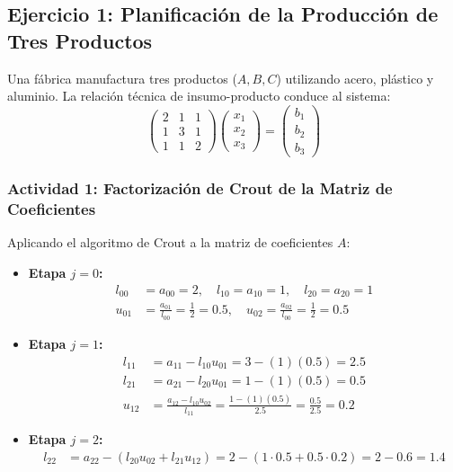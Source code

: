 \documentclass[11pt,a4paper]{article}
\theoremstyle{definition}
\theoremstyle{remark}
\begin{document}
\subsection{Ejercicio 1: Planificación de la Producción de Tres Productos}
Una fábrica manufactura tres productos ($A, B, C$) utilizando acero, plástico y aluminio. La relación técnica de insumo-producto conduce al sistema:
\begin{equation}
    \begin{pmatrix}
        2 & 1 & 1 \\
        1 & 3 & 1 \\
        1 & 1 & 2
    \end{pmatrix}
    \begin{pmatrix}
        x_1 \\ x_2 \\ x_3
    \end{pmatrix}
    =
    \begin{pmatrix}
        b_1 \\ b_2 \\ b_3
    \end{pmatrix}
\end{equation}

\subsubsection{Actividad 1: Factorización de Crout de la Matriz de Coeficientes}
Aplicando el algoritmo de Crout a la matriz de coeficientes $A$:
\begin{itemize}
    \item \textbf{Etapa $j = 0$:}
    \begin{align*}
        l_{00} &= a_{00} = 2, \quad l_{10} = a_{10} = 1, \quad l_{20} = a_{20} = 1 \\
        u_{01} &= \frac{a_{01}}{l_{00}} = \frac{1}{2} = 0.5, \quad u_{02} = \frac{a_{02}}{l_{00}} = \frac{1}{2} = 0.5
    \end{align*}
    \item \textbf{Etapa $j = 1$:}
    \begin{align*}
        l_{11} &= a_{11} - l_{10} u_{01} = 3 - (1)(0.5) = 2.5 \\
        l_{21} &= a_{21} - l_{20} u_{01} = 1 - (1)(0.5) = 0.5 \\
        u_{12} &= \frac{a_{12} - l_{10}u_{02}}{l_{11}} = \frac{1 - (1)(0.5)}{2.5} = \frac{0.5}{2.5} = 0.2
    \end{align*}
    \item \textbf{Etapa $j = 2$:}
    \begin{align*}
        l_{22} &= a_{22} - (l_{20}u_{02} + l_{21}u_{12}) = 2 - (1\cdot 0.5 + 0.5\cdot 0.2) = 2 - 0.6 = 1.4
    \end{align*}
\end{itemize}
\end{document}

